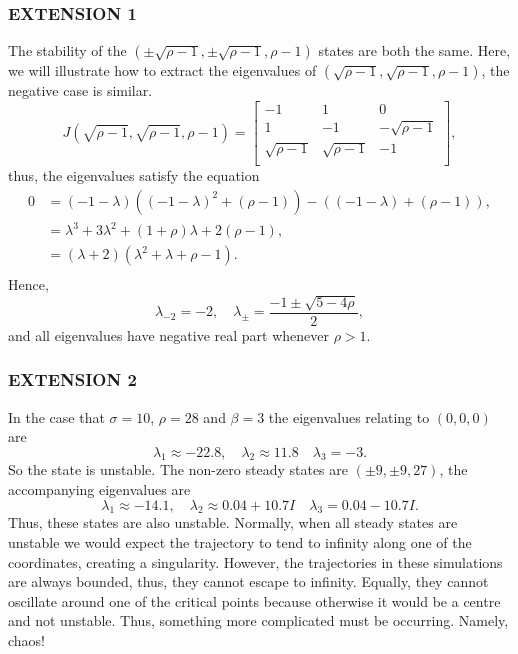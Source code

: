 \documentclass[]{article}
\newcommand{\bb}{\begin{equation}}
\newcommand{\ee}{\end{equation}}
\begin{document}
\begin{Answ}
\subsubsection{EXTENSION 1}
The stability of the $(\pm\sqrt{\rho-1},\pm\sqrt{\rho-1},\rho-1)$ states are both the same. Here, we will illustrate how to extract the eigenvalues of $(\sqrt{\rho-1},\sqrt{\rho-1},\rho-1)$, the negative case is similar.
\bb
J(\sqrt{\rho-1},\sqrt{\rho-1},\rho-1)=\left[ {\begin{array}{ccc}
   -1 & 1 & 0 \\
   1 & -1 & -\sqrt{\rho-1} \\
   \sqrt{\rho-1}  & \sqrt{\rho-1} & -1 \\
  \end{array} } \right],
\ee
thus, the eigenvalues satisfy the equation
\begin{align}
0&=(-1-\lambda)((-1-\lambda)^2+(\rho-1))-((-1-\lambda)+(\rho-1)),\\
&=\lambda^3+3\lambda^2+(1+\rho)\lambda+2(\rho-1),\\
&=(\lambda+2)(\lambda^2+\lambda+\rho-1).\\
\end{align}
Hence,
\bb
\lambda_{-2}=-2,\quad\lambda_{\pm}=\frac{-1\pm\sqrt{5-4\rho}}{2},
\ee
and all eigenvalues have negative real part whenever $\rho>1$.

\subsubsection{EXTENSION 2}
In the case that  $\sigma=10$, $\rho=28$ and $\beta=3$ the eigenvalues relating to $(0,0,0)$ are
\bb
\lambda_1\approx-22.8,\quad\lambda_2\approx 11.8\quad\lambda_3=-3.
\ee
So the state is unstable. The non-zero steady states are $(\pm9,\pm9,27)$, the accompanying eigenvalues are
\bb
\lambda_1\approx-14.1,\quad\lambda_2\approx 0.04+10.7I\quad\lambda_3=0.04-10.7I.
\ee
Thus, these states are also unstable. Normally, when all steady states are unstable we would expect the trajectory to tend to infinity along one of the coordinates, creating a singularity. However, the trajectories in these simulations are always bounded, thus, they cannot escape to infinity. Equally, they cannot oscillate around one of the critical points because otherwise it would be a centre and not unstable. Thus, something more complicated must be occurring. Namely, chaos!
\end{Answ}
%
\end{document}
